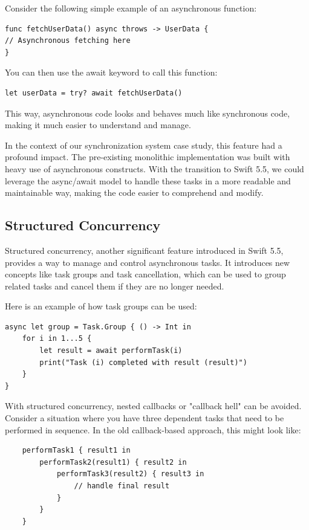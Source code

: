 Consider the following simple example of an asynchronous function:

\begin{verbatim}
func fetchUserData() async throws -> UserData {
// Asynchronous fetching here
}
\end{verbatim}

You can then use the await keyword to call this function:

\begin{verbatim}
let userData = try? await fetchUserData()
\end{verbatim}

This way, asynchronous code looks and behaves much like synchronous code, making it much easier to understand and manage.

In the context of our synchronization system case study, this feature had a profound impact. The pre-existing monolithic implementation was built with heavy use of asynchronous constructs. With the transition to Swift 5.5, we could leverage the async/await model to handle these tasks in a more readable and maintainable way, making the code easier to comprehend and modify.

\subsection{Structured Concurrency}
\label{subsec:StructuredConcurrency}

Structured concurrency, another significant feature introduced in Swift 5.5, provides a way to manage and control asynchronous tasks. It introduces new concepts like task groups and task cancellation, which can be used to group related tasks and cancel them if they are no longer needed.

Here is an example of how task groups can be used:

\begin{verbatim}
async let group = Task.Group { () -> Int in
	for i in 1...5 {
		let result = await performTask(i)
		print("Task (i) completed with result (result)")
	}
}
\end{verbatim}

With structured concurrency, nested callbacks or "callback hell" can be avoided. Consider a situation where you have three dependent tasks that need to be performed in sequence. In the old callback-based approach, this might look like:

\begin{verbatim}
	performTask1 { result1 in
		performTask2(result1) { result2 in
			performTask3(result2) { result3 in
				// handle final result
			}
		}
	}
\end{verbatim}


